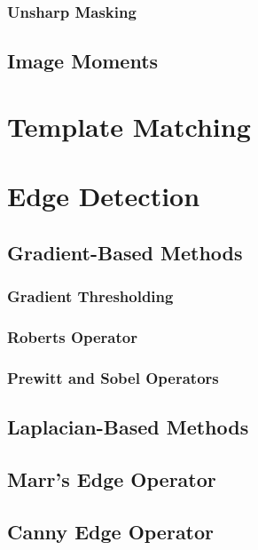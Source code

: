 \documentclass{article}
\begin{document}
\subsubsection{Unsharp Masking}
\subsection{Image Moments}

\section{Template Matching}

\section{Edge Detection}
\subsection{Gradient-Based Methods}
\subsubsection{Gradient Thresholding}
\subsubsection{Roberts Operator}
\subsubsection{Prewitt and Sobel Operators}
\subsection{Laplacian-Based Methods}
\subsection{Marr's Edge Operator}
\subsection{Canny Edge Operator}
\end{document}
